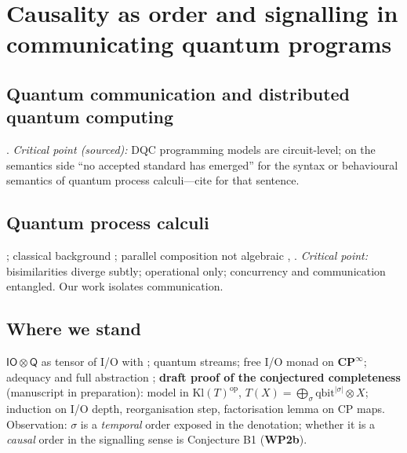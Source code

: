 \documentclass[11pt,a4paper]{article}
\newif\ifskeletonnotes
\newcommand{\sknote}[1]{\ifskeletonnotes{\small\color{blue!60!black}\textit{[#1]}}\fi}
\newcommand{\budget}[1]{\ifskeletonnotes{\small\color{red!60!black}\textbf{(\textasciitilde#1 words)}}\fi}
\newcommand{\WP}[1]{\textbf{WP#1}}
\newcommand{\iotq}{\mathsf{IO}\otimes\mathsf{Q}}   %
\newcommand{\CPinf}{\mathbf{CP}^{\infty}}
\begin{document}
\section{Causality as order and signalling in communicating quantum programs}\budget{1200}
\subsection{Quantum communication and distributed quantum computing}\budget{120}
\cite{Teleportation_PhysRevLett.70.1895,BB84_BENNETT20147,DQC_survey_Caleffi_2024}. \emph{Critical point (sourced):} DQC programming models are circuit-level; on the semantics side ``no accepted standard has emerged'' for the syntax or behavioural semantics of quantum process calculi---cite \cite{lqCCS_10.1145/3632885} for that sentence.
\subsection{Quantum process calculi}\budget{250}
\cite{CQP_gay2004communicatingquantumprocesses,QPAlg_lalire2004processalgebraicapproachconcurrent,qCCS_ying2010algebraquantumprocesses,lqCCS_10.1145/3632885,ceragiolicoalgebraic}; classical background \cite{ccs_10.5555/539036,CSP_10.1145/359576.359585,pi_calc_MILNER19921}; parallel composition not algebraic \cite{stark:freamp,CSP_van_Glabbeek_2010} \sknote{check this key says that}, \cite{Cooperative_Threads_DBLP:journals/corr/abs-1009-2405}. \emph{Critical point:} bisimilarities diverge subtly; operational only; concurrency and communication entangled. Our work isolates communication.
\subsection{Where we stand}\budget{150}
$\iotq$ as tensor of I/O with \cite{statonpopl15}; quantum streams; free I/O monad on $\CPinf$; adequacy and full abstraction \cite{wang_algebraic_2024}; \textbf{draft proof of the conjectured completeness} (manuscript in preparation): model in $\mathrm{Kl}(T)^{\mathrm{op}}$, $T(X)=\bigoplus_\sigma \mathrm{qbit}^{|\sigma|}\otimes X$; induction on I/O depth, reorganisation step, factorisation lemma on CP maps. Observation: $\sigma$ is a \emph{temporal} order exposed in the denotation; whether it is a \emph{causal} order in the signalling sense is Conjecture B1 (\WP{2b}).
\end{document}
